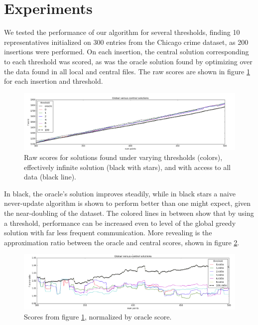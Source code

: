 \section{Experiments}
\label{s:experiments}

We tested the performance of our algorithm for several thresholds, finding 10 representatives initialized on 300 entries from the Chicago crime dataset, as 200 insertions were performed. On each insertion, the central solution corresponding to each threshold was scored, as was the oracle solution found by optimizing over the data found in all local and central files. The raw scores are shown in figure \ref{fig:scores} for each insertion and threshold.

\begin{figure}
    \centering
    \includegraphics[width=\linewidth]{scores}
    \caption{Raw scores for solutions found under varying thresholds (colors), effectively infinite solution (black with stars), and with access to all data (black line).}
    \label{fig:scores}
\end{figure}

In black, the oracle's solution improves steadily, while in black stars a naive never-update algorithm is shown to perform better than one might expect, given the near-doubling of the dataset. The colored lines in between show that by using a threshold, performance can be increased even to level of the global greedy solution with far less frequent communication. More revealing is the approximation ratio between the oracle and central scores, shown in figure \ref{fig:ratio}.

\begin{figure}
    \centering
    \includegraphics[width=\linewidth]{ratio}
    \caption{Scores from figure \ref{fig:scores}, normalized by oracle score.}
    \label{fig:ratio}
\end{figure}

